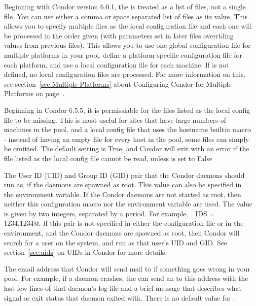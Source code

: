 \begin{description}
  Beginning with Condor version 6.0.1, the
   is treated as a list of files, not a
  single file.  You can use either a comma or space separated list of
  files as its value.  This allows you to specify multiple files as
  the local configuration file and each one will be processed in the
  order given (with parameters set in later files overriding values
  from previous files).  This allows you to use one global
  configuration file for multiple platforms in your pool, define a
  platform-specific configuration file for each platform, and use a
  local configuration file for each machine.  If
   is not defined, no local configuration
  files are processed.  For more information on this, see
  section~\ref{sec:Multiple-Platforms} about Configuring Condor for
  Multiple Platforms on page~\pageref{sec:Multiple-Platforms}.

\item[\Macro{REQUIRE\_LOCAL\_CONFIG\_FILE}] \label{param:RequireLocalConfigFile}
  Beginning in Condor 6.5.5, it is permissiable for the files listed as the
  local config file to be missing. This is most useful for sites that have 
  large numbers of machines in the pool, and a local config file that uses
  the hostname builtin macro - instead of having an empty file for every host
  in the pool, some files can simply be omitted. The default setting is True,
  and Condor will exit with an error if the file listed as the local config 
  file cannot be read, unless  is set 
  to False 

\item[\Macro{CONDOR\_IDS}] \label{param:CondorIds}
  The User ID (UID) and Group ID (GID) pair that the Condor daemons
  should run as, if the daemons are spawned as root.
  This value can also be specified in the 
  environment variable.
  If the Condor daemons are not started as root, then neither this
   configuration macro nor the 
  environment variable are used.
  The value is given by two integers, separated by a period.  For
  example, \verb@CONDOR_IDS = 1234.1234@.
  If this pair is not specified in either the configuration file or in the
  environment, and the Condor daemons are spawned as root,
  then Condor will
  search for a \verb@condor@ user on the system, and run as that user's
  UID and GID.
  See section~\ref{sec:uids} on UIDs in Condor for more details.

\item[\Macro{CONDOR\_ADMIN}] \label{param:CondorAdmin} The email
  address that Condor will send mail to if something goes wrong in
  your pool.  For example, if a daemon crashes, the 
  can send an  to this address with the last few lines
  of that daemon's log file and a brief message that describes what
  signal or exit status that daemon exited with.  There is no default
  value for .
  

\end{description}
